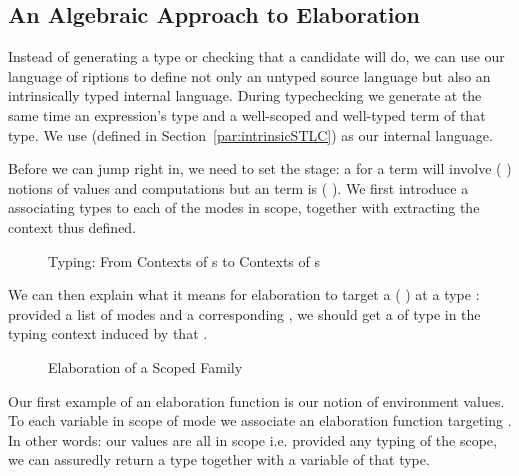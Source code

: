 \subsection{An Algebraic Approach to Elaboration}\label{section:elaboration}

Instead of generating a type or checking that a candidate will do, we can use
our language of riptions to define not only an untyped source language
but also an intrinsically typed internal language. During typechecking we generate
at the same time an expression's type and a well-scoped and well-typed term of
that type. We use  (defined in Section~\ref{par:intrinsicSTLC}) as our
internal language.

Before we can jump right in, we need to set the stage: a  for a
 term will involve ({ }) notions of values and
computations but an  term is ({ }). We first
introduce a  associating types to each of the modes in scope, together
with  extracting the context thus defined.

\begin{figure}[h]
\begin{minipage}[t]{0.4\textwidth}
\end{minipage}
\begin{minipage}[t]{0.5\textwidth}
\end{minipage}
\caption{Typing: From Contexts of s to Contexts of s\label{fig:typingmodes}}
\end{figure}

We can then explain what it means for elaboration to target  a
({ }) at a type : provided a list of modes and a
corresponding , we should get a  of type  in the
typing context induced by that .

\begin{figure}[h]
\caption{Elaboration of a Scoped Family}
\end{figure}

Our first example of an elaboration function is our notion of environment values.
To each variable in scope of mode  we associate an elaboration function
targeting . In other words: our values are all in scope i.e. provided any
typing of the scope, we can assuredly return a type together with a variable of
that type.

